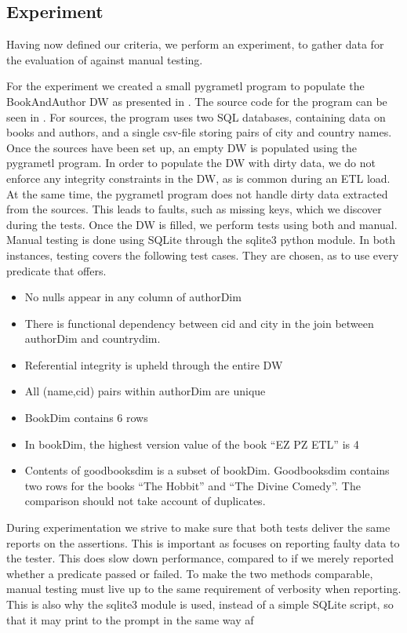 \subsection{Experiment}
Having now defined our criteria, we perform an experiment, to gather data for the evaluation of \FW{} against manual testing.

For the experiment we created a small pygrametl program to populate the BookAndAuthor DW as presented in . The source code for the program can be seen in . For sources, the program uses two SQL databases, containing data on books and authors, and a single csv-file storing pairs of city and country names. Once the sources have been set up, an empty DW is populated using the pygrametl program. In order to populate the DW with dirty data, we do not enforce any integrity constraints in the DW, as is common during an ETL load. At the same time, the pygrametl program does not handle dirty data extracted from the sources. This leads to faults, such as missing keys, which we discover during the tests. Once the DW is filled, we perform tests using both \FW{} and manual. Manual testing is done using SQLite through the sqlite3 python module. In both instances, testing covers the following test cases. They are chosen, as to use every predicate that \FW{} offers.

\begin{itemize}
\item No nulls appear in any column of authorDim
\item There is functional dependency between cid and city in the join between authorDim and countrydim.
\item Referential integrity is upheld through the entire DW
\item All (name,cid) pairs within authorDim are unique
\item BookDim contains 6 rows
\item In bookDim, the highest version value of the book “EZ PZ ETL” is 4
\item Contents of goodbooksdim is a subset of bookDim. Goodbooksdim contains two rows for the books “The Hobbit” and “The Divine Comedy”. The comparison should not take account of duplicates.
\end{itemize}

During experimentation we strive to make sure that both tests deliver the same reports on the assertions. This is important as \FW{} focuses on reporting faulty data to the tester. This does slow down performance, compared to if we merely reported whether a predicate passed or failed. To make the two methods comparable, manual testing must live up to the same requirement of verbosity when reporting. This is also why the sqlite3 module is used, instead of a simple SQLite script, so that it may print to the prompt in the same way af \FW{}

